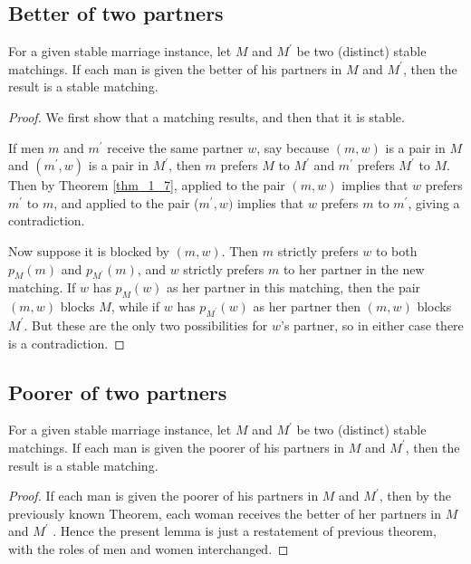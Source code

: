 \subsection{Better of two partners}

\begin{theorem}\label{thm_1_8}
    For a given stable marriage instance, let $M$ and $M^\prime$ be two (distinct) stable matchings. If each man is given the better of his partners in $M$ and $M^\prime$, then the result is a stable matching.
\end{theorem}


\begin{proof}
    We first show that a matching results, and then that it is stable.
    
    If men $m$ and $m^\prime$ receive the same partner $w$, say because $(m, w)$ is a pair in $M$ and $(m^\prime , w)$ is a pair in $M^\prime$, then $m$ prefers $M$ to $M^\prime$ and $m^\prime$ prefers $M^\prime$ to $M$. Then by Theorem \ref{thm_1_7}, applied to the pair $(m, w)$ implies that $w$ prefers $m^\prime$ to $m$, and applied to the pair ($m^\prime , w)$ implies that $w$ prefers $m$ to $m^\prime$, giving a contradiction. 
    
    Now suppose it is blocked by $(m, w)$. Then $m$ strictly prefers $w$ to both $p_M(m)$ and $p_{M^\prime}(m)$, and $w$ strictly prefers $m$ to her partner in the new matching. If $w$ has $p_M(w)$ as her partner in this matching, then the pair $(m, w)$ blocks $M$, while if $w$ has $p_{M^\prime}(w)$ as her partner then $(m, w)$ blocks $M^\prime$. But these are the only two possibilities for $w$'s partner, so in either case there is a contradiction. 
\end{proof}
\newpage    

\subsection{Poorer of two partners}

\begin{theorem}
    For a given stable marriage instance, let $M$ and $M^\prime$ be two (distinct) stable matchings. If each man is given the poorer of his partners in $M$ and $M^\prime$, then the result is a stable matching.
\end{theorem}

\begin{proof}
    If each man is given the poorer of his partners in $M$ and $M^\prime$, then by the previously known Theorem, each woman receives the better of her partners in $M$ and $M^\prime$ . Hence the present lemma is just a restatement of previous theorem, with the roles of men and women interchanged.
\end{proof}

